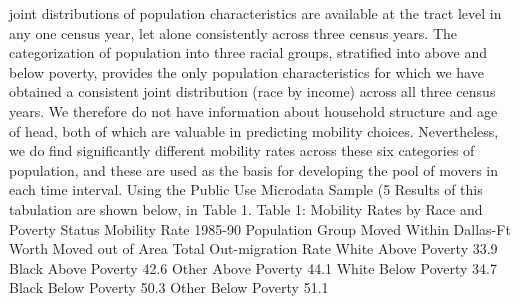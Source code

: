 \documentclass[12pt,a4paper]{article}
\begin{document}
joint distributions of population characteristics are available at
the tract level in any one census year, let alone consistently
across three census years.  The categorization of population into
three racial groups, stratified into above and below poverty,
provides the only population characteristics for which we have
obtained a consistent joint distribution (race by income) across
all three census years.  We therefore do not have information
about household structure and age of head, both of which are
valuable in predicting mobility choices.
Nevertheless, we do find significantly different mobility rates across these six categories of population, and these are used as the basis for developing the pool of movers in each time interval.  Using the Public Use Microdata Sample (5%
Results of this tabulation are shown below, in Table 1. Table 1:
Mobility Rates by Race and Poverty Status
    Mobility Rate 1985-90
Population Group    Moved Within Dallas-Ft Worth    Moved out of
Area   Total Out-migration Rate
White Above Poverty 33.9%
Black Above Poverty 42.6%
Other Above Poverty 44.1%
White Below Poverty 34.7%
Black Below Poverty 50.3%
Other Below Poverty 51.1%
\end{document}
